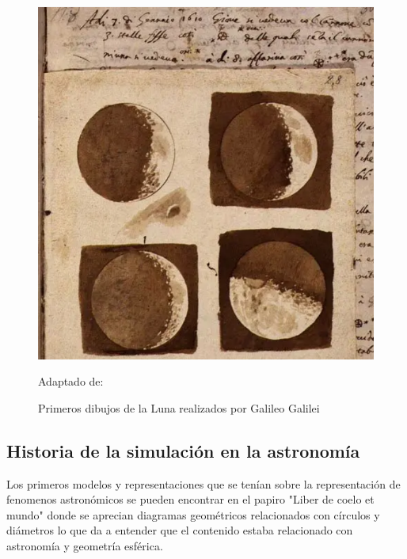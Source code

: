 \begin{figure}[h]
    \includegraphics[scale = 0.5]{Imagenes/GalileoMoon.png}
    \centering
    \caption{Primeros dibujos de la Luna realizados por Galileo Galilei}{ Adaptado de: \cite{bbc}}

\end{figure}

\subsection{Historia de la simulación en la astronomía}

Los primeros modelos y representaciones que se tenían sobre la representación 
de fenomenos astronómicos se pueden encontrar en el papiro "Liber de coelo et mundo"
donde se aprecian diagramas geométricos relacionados con círculos y diámetros lo que da a entender
que el contenido estaba relacionado con astronomía y geometría esférica.

